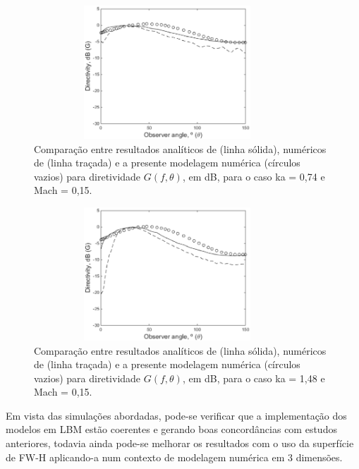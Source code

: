 \begin{figure}[ht!]
	\centering
	 \includegraphics[width=10cm, height=5cm]{figuras/ka_074_015.eps}
	\caption{Comparação entre resultados analíticos de  (linha sólida), numéricos de  (linha traçada) e a presente modelagem numérica (círculos vazios) para diretividade $G(f,\theta)$, em dB, para o caso ka = 0,74 e Mach = 0,15.}
	\label{fig:duto_2_3}
\end{figure}

\begin{figure}[ht!]
	\centering
	 \includegraphics[width=10cm, height=5cm]{figuras/ka_148_015.eps}
	\caption{Comparação entre resultados analíticos de  (linha sólida), numéricos de  (linha traçada) e a presente modelagem numérica (círculos vazios) para diretividade $G(f,\theta)$, em dB, para o caso ka = 1,48 e Mach = 0,15.}
	\label{fig:duto_2_4}
\end{figure}

Em vista das simulações abordadas, pode-se verificar que a implementação dos modelos em LBM estão coerentes e gerando boas concordâncias com estudos anteriores, todavia ainda pode-se melhorar os resultados com o uso da superfície de FW-H aplicando-a num contexto de modelagem numérica em 3 dimensões.

